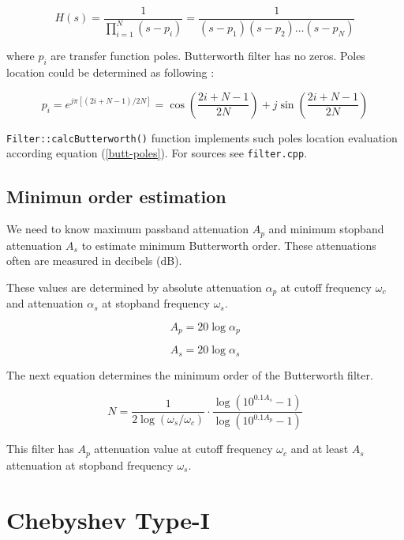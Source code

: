 \begin{equation}
 H(s) = \frac{1}{\prod\limits_{i=1}^N(s-p_i)}=
\frac{1}{(s-p_1)(s-p_2)\ldots(s-p_N)}
\end{equation}

where $p_i$ are transfer function poles. Butterworth filter has no zeros. Poles
location could be determined as following \cite{Hamming}:

\begin{equation}
 p_i = e^{j\pi[(2i+N-1)/2N]} = 
 \cos\left(\frac{2i+N-1}{2N}\right) + j\sin\left(\frac{2i+N-1}{2N}\right)
\label{butt-poles}
\end{equation}

\verb|Filter::calcButterworth()| function implements such poles location
evaluation according equation (\ref{butt-poles}). For sources see
\verb|filter.cpp|.


\subsection{Minimun order estimation}

We need to know maximum passband attenuation $A_p$ and minimum stopband
attenuation $A_s$ to estimate minimum Butterworth order. These attenuations
often are measured in decibels (dB).

These values are determined by absolute attenuation $\alpha_p$ at cutoff
frequency $\omega_c$ and attenuation $\alpha_s$ at stopband frequency
$\omega_s$.

\begin{equation}
 A_p = 20\log\alpha_p
\end{equation}

\begin{equation}
 A_s = 20\log\alpha_s
\end{equation}



The next equation determines the minimum order of the Butterworth filter.

\begin{equation}
 N = \frac{1}{2\log(\omega_s/\omega_c)} \cdot
\frac{\log(10^{0.1A_s}-1)}{\log(10^{0.1A_p}-1) } \label{butt-order}
\end{equation}

This filter has $A_p$ attenuation value at cutoff frequency $\omega_c$
and at least $A_s$ attenuation at stopband frequency $\omega_s$.


\section{Chebyshev Type-I}

